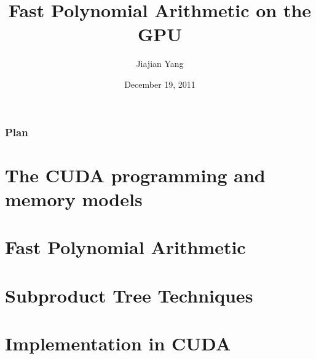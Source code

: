 \documentclass{beamer}
\title[]{Fast Polynomial Arithmetic on the GPU}
\author[]{Jiajian Yang}
\institute[]{
University of Western Ontario, Canada
}
\date[]{December 19, 2011}
\begin{document}
\maketitle


\begin{frame} %
\frametitle{Plan}  %
\tableofcontents
\end{frame}

\section{The CUDA programming and memory models} %


\section{Fast Polynomial Arithmetic} %


\section{Subproduct Tree Techniques} %


\section{Implementation in CUDA}     %

\end{document}
